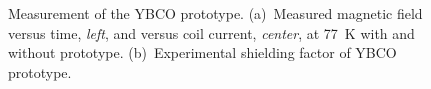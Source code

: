 \begin{refsection}
\begin{figure}
    \centering
		\hfill
    \caption{Measurement of the YBCO prototype. (a)~Measured magnetic field versus time, {\it left}, and versus coil current, {\it center}, at \SI{77}{K} with and without prototype. (b)~Experimental shielding factor of YBCO prototype.}
    \label{fig:YBCO}
\end{figure}
%



\end{refsection}

